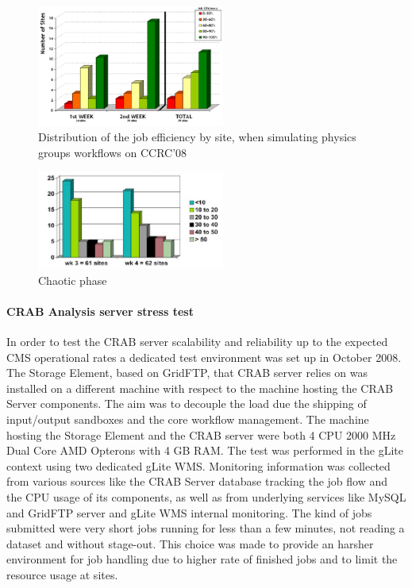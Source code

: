 \begin{figure}
\centering
\includegraphics[width=0.55\textwidth]{figures/CCRC08SiteEff.png}
\caption{Distribution of the job efficiency by site, when simulating physics
groups workflows on CCRC’08}
\label{fig:CCRC08SiteEff}
\end{figure}
\begin{figure}
\centering
\includegraphics[width=0.55\textwidth]{figures/CCRC08Chaotic.png}
\caption{Chaotic phase}
\label{fig:CCRC08Chaotic}
\end{figure}

\paragraph{CRAB Analysis server stress test} 
In order to test the CRAB server scalability and reliability up to
the expected CMS operational rates a dedicated test environment was
set up in October 2008. The Storage Element, based on GridFTP, 
that CRAB server relies on was installed on a different machine with 
respect to the machine hosting the CRAB Server components. The aim was 
to decouple the load
due the shipping of input/output sandboxes and the core workflow
management. The machine hosting the Storage Element and the CRAB
server were both 4 CPU 2000 MHz Dual Core AMD Opterons with 4 GB
RAM. The test was performed in the gLite context using two dedicated
gLite WMS. Monitoring information was collected from various sources
like the CRAB Server database tracking the job flow and the CPU usage
of its components, as well as from underlying services like MySQL and
GridFTP server and gLite WMS internal monitoring. The kind of
jobs submitted were very short jobs running for less than a few
minutes, not reading a dataset and without stage-out. This choice was
made to provide an harsher environment for job handling due to higher
rate of finished jobs and to limit the resource usage at sites.

